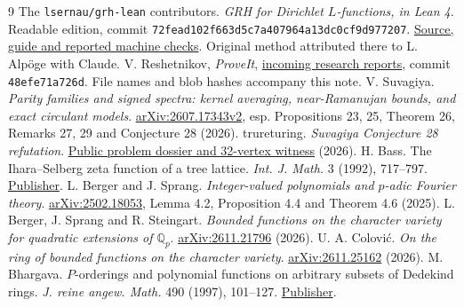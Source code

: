 \documentclass[11pt,letterpaper]{article}
\begin{document}
\begin{thebibliography}{9}\small
{} The \texttt{lsernau/grh-lean} contributors. \emph{GRH for Dirichlet $L$-functions, in Lean 4}. Readable edition, commit \texttt{72fead102f663d5c7a407964a13dc0cf9d977207}. \href{https://github.com/lsernau/grh-lean/tree/72fead102f663d5c7a407964a13dc0cf9d977207/grh}{Source, guide and reported machine checks}. Original method attributed there to L. Alp\"oge with Claude.
 V. Reshetnikov, \emph{ProveIt}, \href{https://github.com/VladimirReshetnikov/ProveIt/tree/48efe71a726dddc5a505534edaa4c0fd190416b9/docs/incoming}{incoming research reports}, commit \texttt{48efe71a726d}. File names and blob hashes accompany this note.
 V. Suvagiya. \emph{Parity families and signed spectra: kernel averaging, near-Ramanujan bounds, and exact circulant models}. \href{https://arxiv.org/html/2607.17343v2}{arXiv:2607.17343v2}, esp. Propositions 23, 25, Theorem 26, Remarks 27, 29 and Conjecture 28 (2026).
 trureturing. \emph{Suvagiya Conjecture 28 refutation}. \href{https://www.trureturing.org/research/suvagiya-conjecture28-refutation/}{Public problem dossier and 32-vertex witness} (2026).
 H. Bass. The Ihara--Selberg zeta function of a tree lattice. \emph{Int. J. Math.} 3 (1992), 717--797. \href{https://doi.org/10.1142/S0129167X92000357}{Publisher}.
 L. Berger and J. Sprang. \emph{Integer-valued polynomials and $p$-adic Fourier theory}. \href{https://arxiv.org/abs/2502.18053}{arXiv:2502.18053}, Lemma 4.2, Proposition 4.4 and Theorem 4.6 (2025).
 L. Berger, J. Sprang and R. Steingart. \emph{Bounded functions on the character variety for quadratic extensions of $\mathbb Q_p$}. \href{https://arxiv.org/abs/2611.21796}{arXiv:2611.21796} (2026).
 U. A. Colovi\'c. \emph{On the ring of bounded functions on the character variety}. \href{https://arxiv.org/abs/2611.25162}{arXiv:2611.25162} (2026).
 M. Bhargava. $P$-orderings and polynomial functions on arbitrary subsets of Dedekind rings. \emph{J. reine angew. Math.} 490 (1997), 101--127. \href{https://doi.org/10.1515/crll.1997.490.101}{Publisher}.
\end{thebibliography}
\end{document}
